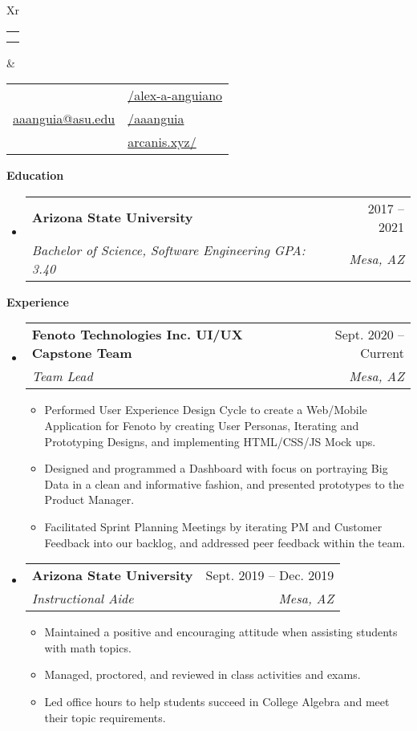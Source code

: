 \documentclass[letterpaper,12pt]{article}[leftmargin=*]
\makeatletter
\def \fullname {Alex Anguiano}
\def \subtitle {}
\def \linkedinicon {\faLinkedin}
\def \linkedinlink {https://www.linkedin.com/in/alex-a-anguiano/}
\def \linkedintext {/alex-a-anguiano}
\def \phoneicon {\faPhone}
\def \phonetext {+1-480-335-2816}
\def \emailicon {\faEnvelope}
\def \emaillink {mailto:aaanguia@asu.edu}
\def \emailtext {aaanguia@asu.edu}
\def \githubicon {\faGithub}
\def \githublink {https://github.com/aaanguia}
\def \githubtext {/aaanguia}
\def \websiteicon {\faGlobe}
\def \websitelink {http://arcanis.xyz/}
\def \websitetext {arcanis.xyz/}
\def \headertype {\doublecol} %
\def \entryspacing {-0pt}
\def \linkedin {\linkedinicon \hspace{3pt}\href{\linkedinlink}{\linkedintext}}
\def \phone {\phoneicon \hspace{3pt}{ \phonetext}}
\def \email {\emailicon \hspace{3pt}\href{\emaillink}{\emailtext}}
\def \github {\githubicon \hspace{3pt}\href{\githublink}{\githubtext}}
\def \website {\websiteicon \hspace{3pt}\href{\websitelink}{\websitetext}}
\renewcommand{\section}[2]{\vspace{5pt}
  \colorbox{secondary}{\color{white}\raggedbottom\normalsize\textbf{{#1}{\hspace{7pt}#2}}}
}
\newcommand{\resumeEntryStart}{\begin{itemize}[leftmargin=2.5mm]}
\newcommand{\resumeEntryEnd}{\end{itemize}\vspace{\entryspacing}}
\newcommand{\resumeItemListStart}{\begin{itemize}[leftmargin=4.5mm]}
\newcommand{\resumeItemListEnd}{\end{itemize}}
\newcommand{\resumeItem}[1]{
  \item\small{
    {#1 \vspace{-2pt}}
  }
}
\newcommand{\resumeEntryTSDL}[4]{
  \vspace{-1pt}\item[]
    \begin{tabularx}{0.97\textwidth}{X@{\hspace{60pt}}r}
      \textbf{\color{primary}#1} & {\firabook\color{accent}\small#2} \\
      \textit{\color{accent}\small#3} & \textit{\color{accent}\small#4} \\
    \end{tabularx}\vspace{-6pt}
}
\newcommand{\doublecol}[6]{
  \begin{tabularx}{\textwidth}{Xr}
    {
      \begin{tabular}[c]{l}
        \fontsize{35}{45}\selectfont{\color{primary}{{\textbf{\fullname}}}} \\
        {\textit{\subtitle}} %
      \end{tabular}
    } & {
      \begin{tabular}[c]{l@{\hspace{1.5em}}l}
        {\small#4} & {\small#1} \\
        {\small#5} & {\small#2} \\
        {\small#6} & {\small#3}
      \end{tabular}
    }
  \end{tabularx}
}
\newcommand{\singlecol}[6]{
  \begin{tabularx}{\textwidth}{Xr}
    {
      \begin{tabular}[b]{l}
        \fontsize{35}{45}\selectfont{\color{primary}{{\textbf{\fullname}}}} \\
        {\textit{\subtitle}} %
      \end{tabular}
    } & {
      \begin{tabular}[c]{l}
        {\small#1} \\
        {\small#2} \\
        {\small#3} \\
        {\small#4} \\
        {\small#5} \\
        {\small#6}
      \end{tabular}
    }
  \end{tabularx}
}
\makeatother
\begin{document}


\headertype{\linkedin}{\github}{\website}{\phone}{\email}{} %
\vspace{-10pt} %

\section{\faGraduationCap}{Education}

  \resumeEntryStart
    \resumeEntryTSDL
      {Arizona State University}{2017 -- 2021}
      {Bachelor of Science, Software Engineering \quad GPA: 3.40}{Mesa, AZ}
  \resumeEntryEnd

\section{\faPieChart}{Experience}



  \resumeEntryStart
    \resumeEntryTSDL
      {Fenoto Technologies Inc. UI/UX Capstone Team}{Sept. 2020 -- Current}
      {Team Lead}{Mesa, AZ}
    \resumeItemListStart
        \resumeItem {Performed User Experience Design Cycle to create a Web/Mobile Application for Fenoto by creating User Personas, Iterating and Prototyping Designs, and implementing HTML/CSS/JS Mock ups.}
        \resumeItem {Designed and programmed a Dashboard with focus on portraying Big Data in a clean and informative fashion, and presented prototypes to the Product Manager. }
        \resumeItem {Facilitated Sprint Planning Meetings by iterating PM and Customer Feedback into our backlog, and addressed peer feedback within the team. }
    \resumeItemListEnd
  \resumeEntryEnd

  \resumeEntryStart
    \resumeEntryTSDL
      {Arizona State University}{Sept. 2019 -- Dec. 2019}
      {Instructional Aide}{Mesa, AZ}
    \resumeItemListStart
      \resumeItem {Maintained a positive and encouraging attitude when assisting students with math topics.}
      \resumeItem {Managed, proctored, and reviewed in class activities and exams.}
      \resumeItem {Led office hours to help students succeed in College Algebra and meet their topic requirements. }
    \resumeItemListEnd
  \resumeEntryEnd
\end{document}
